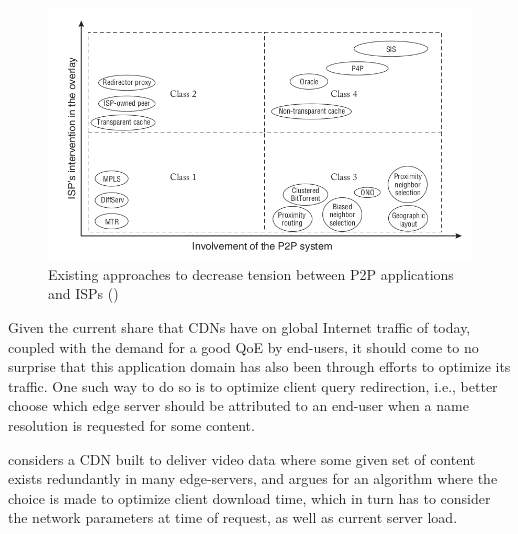     \begin{figure}[!h]
    \centering
    \includegraphics[scale=0.65]{img/approaches-isp-p2p.png}
    \caption{Existing approaches to decrease tension between P2P applications and ISPs (\cite{dan-Commag10})}
    \label{fig:p2p-isp-interactions}
    \end{figure}

        Given the current share that CDNs have on global Internet traffic of today, coupled with the demand for a good QoE by end-users, it should come to no surprise that this application domain has also been through efforts to optimize its traffic.
        One such way to do so is to optimize client query redirection, i.e., better choose which edge server should be attributed to an end-user when a name resolution is requested for some content.

        \cite{gromov2014} considers a CDN built to deliver video data where some given set of content exists redundantly in many edge-servers, and argues for an algorithm where the choice is made to optimize client download time, which in turn has to consider the network parameters at time of request, as well as current server load.

